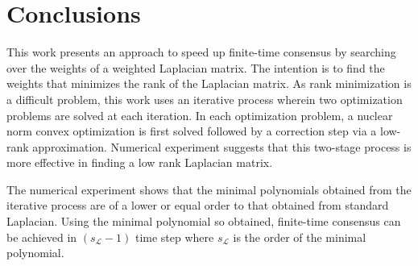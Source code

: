 \documentclass[onecolumn,reviewcopy]{autart}
\def \L{\mathcal{L}}
\begin{document}
\section{Conclusions}\label{sec:con}
This work presents an approach to speed up finite-time consensus by searching over the weights of a weighted Laplacian matrix.
The intention is to find the weights that minimizes the rank of the Laplacian matrix. As rank minimization is a difficult problem, this work
uses an iterative process wherein two optimization problems are solved at each iteration. In each optimization problem, a nuclear norm convex optimization is first solved followed by a correction step via a low-rank approximation. Numerical experiment suggests that this two-stage process is more effective in finding a low rank Laplacian matrix.

The numerical experiment shows that the minimal polynomials obtained from the iterative process are of a lower or equal order to that obtained from standard Laplacian. Using the minimal polynomial so obtained, finite-time consensus can be achieved in $(s_\L -1)$ time step where $s_\L$ is the order of the minimal polynomial.






%








\end{document}
